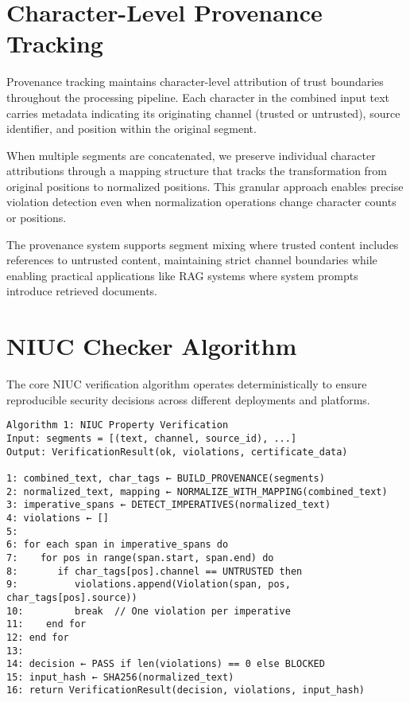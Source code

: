 \section{Character-Level Provenance Tracking}

Provenance tracking maintains character-level attribution of trust boundaries throughout the processing pipeline. Each character in the combined input text carries metadata indicating its originating channel (trusted or untrusted), source identifier, and position within the original segment.

When multiple segments are concatenated, we preserve individual character attributions through a mapping structure that tracks the transformation from original positions to normalized positions. This granular approach enables precise violation detection even when normalization operations change character counts or positions.

The provenance system supports segment mixing where trusted content includes references to untrusted content, maintaining strict channel boundaries while enabling practical applications like RAG systems where system prompts introduce retrieved documents.

\section{NIUC Checker Algorithm}

The core NIUC verification algorithm operates deterministically to ensure reproducible security decisions across different deployments and platforms.

\begin{verbatim}
Algorithm 1: NIUC Property Verification
Input: segments = [(text, channel, source_id), ...]
Output: VerificationResult(ok, violations, certificate_data)

1: combined_text, char_tags ← BUILD_PROVENANCE(segments)
2: normalized_text, mapping ← NORMALIZE_WITH_MAPPING(combined_text)
3: imperative_spans ← DETECT_IMPERATIVES(normalized_text)
4: violations ← []
5: 
6: for each span in imperative_spans do
7:    for pos in range(span.start, span.end) do
8:       if char_tags[pos].channel == UNTRUSTED then
9:          violations.append(Violation(span, pos, char_tags[pos].source))
10:         break  // One violation per imperative
11:    end for
12: end for
13:
14: decision ← PASS if len(violations) == 0 else BLOCKED
15: input_hash ← SHA256(normalized_text)
16: return VerificationResult(decision, violations, input_hash)
\end{verbatim}

